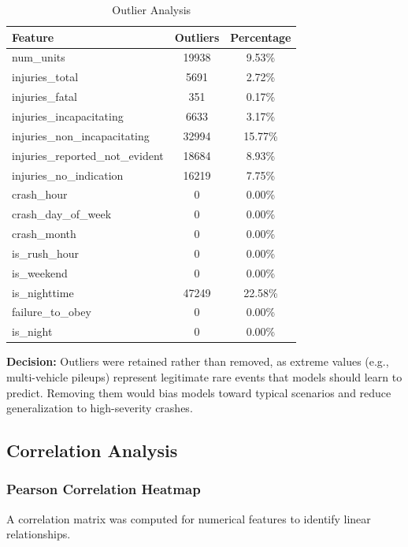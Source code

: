 \documentclass[stu,12pt,floatsintext]{apa7}
\begin{document}
\begin{table}[H]
\centering
\caption{Outlier Analysis}
\begin{tabular}{lcc}
\toprule
\textbf{Feature} & \textbf{Outliers} & \textbf{Percentage} \\
\midrule
num\_units   &  19938   &   9.53\% \\
injuries\_total  &    5691  &    2.72\% \\
injuries\_fatal   &    351   &   0.17\% \\
injuries\_incapacitating   &   6633   &   3.17\% \\
injuries\_non\_incapacitating  &   32994   &  15.77\% \\
injuries\_reported\_not\_evident  &   18684  &    8.93\% \\
injuries\_no\_indication  &   16219   &   7.75\% \\
crash\_hour    &     0   &   0.00\% \\
crash\_day\_of\_week    &     0   &   0.00\% \\
crash\_month     &    0   &   0.00\% \\
is\_rush\_hour    &     0   &   0.00\% \\
is\_weekend     &    0   &   0.00\% \\
is\_nighttime  &   47249   &  22.58\% \\
failure\_to\_obey   &      0  &    0.00\% \\
is\_night    &     0  &    0.00\% \\
\bottomrule
\end{tabular}
\end{table}

\textbf{Decision:} Outliers were retained rather than removed, as extreme values (e.g., multi-vehicle pileups) represent legitimate 
rare events that models should learn to predict. Removing them would bias models toward typical scenarios and reduce generalization 
to high-severity crashes.

\subsection{Correlation Analysis}

\subsubsection{Pearson Correlation Heatmap}

A correlation matrix was computed for numerical features to identify linear relationships.
\end{document}
